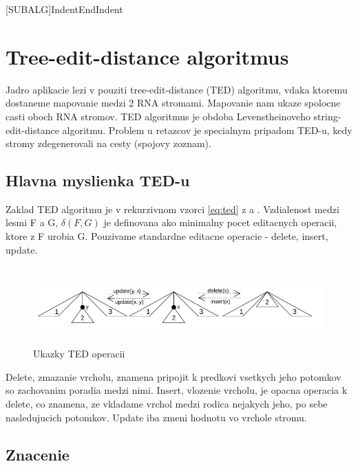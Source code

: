 \newcommand{\Cdel}{\ensuremath{c_{del}}}
\newcommand{\Cins}{\ensuremath{c_{ins}}}
\newcommand{\Cupd}{\ensuremath{c_{upd}}}
\renewcommand{\O}[1]{\ensuremath{\mathcal{O}(#1)}}

[SUBALG]{Indent}{EndIndent}{}{\algorithmicend\ }


\chapter{Tree-edit-distance algoritmus}

Jadro aplikacie lezi v pouziti tree-edit-distance (TED) algoritmu,
vdaka ktoremu dostaneme mapovanie medzi 2 RNA stromami. Mapovanie nam ukaze
spolocne casti oboch RNA stromov. TED algoritmus je obdoba Levenstheinoveho
string-edit-distance algoritmu. Problem u retazcov je specialnym pripadom
TED-u, kedy stromy zdegenerovali na cesty (spojovy zoznam).

\section{Hlavna myslienka TED-u}

Zaklad TED algoritmu je v rekurzivnom vzorci \ref{eq:ted} z \citet{DMRW} a \citet{RTED}. Vzdialenost medzi
lesmi F a G, $\delta(F, G)$ je definovana ako minimalny pocet editacnych operacii,
ktore z F urobia G. Pouzivame standardne editacne operacie - delete, insert, update.

\begin{figure}[H]
\centering
\includegraphics[width=140mm, height=30mm]{../img/TED_operations.png}
\caption{Ukazky TED operacii}
\label{obr:TED_operations}
\end{figure}

Delete, zmazanie vrcholu, znamena pripojit k predkovi vsetkych jeho potomkov so
zachovanim poradia medzi nimi. Insert, vlozenie vrcholu, je opacna operacia k
delete, co znamena, ze vkladame vrchol medzi rodica nejakych jeho, po sebe
nasledujucich potomkov. Update iba zmeni hodnotu vo vrchole stromu.

\section{Znacenie}

